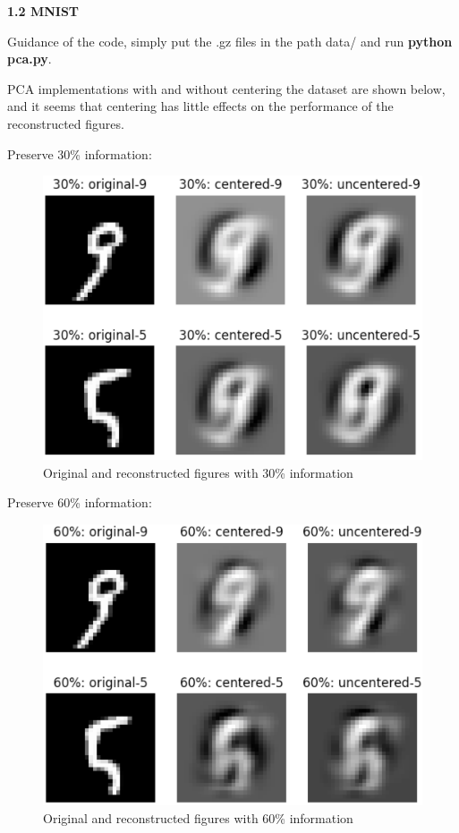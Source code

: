 \documentclass[12pt]{article}
\begin{document}
\bigskip \par
{\bf 1.2 MNIST}
\par
Guidance of the code, simply put the .gz files in the path data/ and run {\bf python pca.py}.
\par
PCA implementations with and without centering the dataset are shown below, and it seems that centering has little effects on the performance of the reconstructed figures. 
\par
Preserve 30\% information:
\begin{figure}[ht]
\centering
\includegraphics[scale=0.56]{30.png}
\caption{Original and reconstructed figures with 30\% information}
\end{figure}
\newpage
Preserve 60\% information:
\begin{figure}[ht]
\centering
\includegraphics[scale=0.56]{60.png}
\caption{Original and reconstructed figures with 60\% information}
\end{figure}
\end{document}
